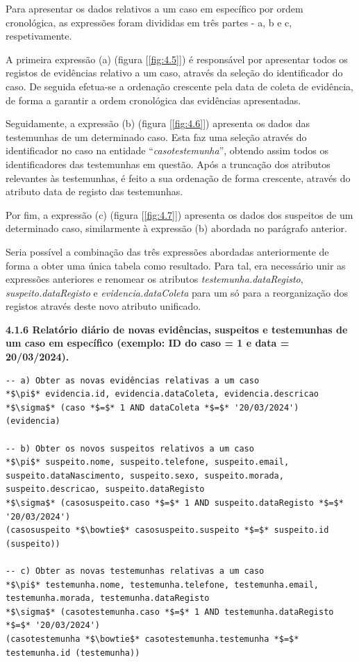 \documentclass[a4paper,12pt]{scrreprt}
\begin{document}
Para apresentar os dados relativos a um caso em específico por ordem cronológica, as expressões foram divididas em três partes - a, b e c, respetivamente.

A primeira expressão (a) (figura [\ref{fig:4.5}]) é responsável por apresentar todos os registos de evidências relativo a um caso, através da seleção do identificador do caso. De seguida efetua-se a ordenação crescente pela data de coleta de evidência, de forma a garantir a ordem cronológica das evidências apresentadas.

Seguidamente, a expressão (b) (figura [\ref{fig:4.6}]) apresenta os dados das testemunhas de um determinado caso. Esta faz uma seleção através do identificador no caso na entidade “\textit{casotestemunha}”, obtendo assim todos os identificadores das testemunhas em questão. Após a truncação dos atributos relevantes às testemunhas, é feito a sua ordenação de forma crescente, através do atributo data de registo das testemunhas.

Por fim, a expressão (c) (figura [\ref{fig:4.7}]) apresenta os dados dos suspeitos de um determinado caso, similarmente à expressão (b) abordada no parágrafo anterior.

Seria possível a combinação das três expressões abordadas anteriormente de forma a obter uma única tabela como resultado. Para tal, era necessário unir as expressões anteriores e renomear os atributos \textit{testemunha.dataRegisto}, \textit{suspeito.dataRegisto} e \textit{evidencia.dataColeta} para um só para a reorganização dos registos através deste novo atributo unificado.

\clearpage %
{\large\textbf{4.1.6 Relatório diário de novas evidências, suspeitos e testemunhas de um caso em específico (exemplo: ID do caso = 1 e data = 20/03/2024).}}

\vspace{0.2cm}
\begin{lstlisting}[escapechar=*]
-- a) Obter as novas evidências relativas a um caso
*$\pi$* evidencia.id, evidencia.dataColeta, evidencia.descricao
*$\sigma$* (caso *$=$* 1 AND dataColeta *$=$* '20/03/2024') (evidencia)

-- b) Obter os novos suspeitos relativos a um caso
*$\pi$* suspeito.nome, suspeito.telefone, suspeito.email, suspeito.dataNascimento, suspeito.sexo, suspeito.morada, suspeito.descricao, suspeito.dataRegisto
*$\sigma$* (casosuspeito.caso *$=$* 1 AND suspeito.dataRegisto *$=$* '20/03/2024')
(casosuspeito *$\bowtie$* casosuspeito.suspeito *$=$* suspeito.id (suspeito))

-- c) Obter as novas testemunhas relativas a um caso
*$\pi$* testemunha.nome, testemunha.telefone, testemunha.email, testemunha.morada, testemunha.dataRegisto
*$\sigma$* (casotestemunha.caso *$=$* 1 AND testemunha.dataRegisto *$=$* '20/03/2024')
(casotestemunha *$\bowtie$* casotestemunha.testemunha *$=$* testemunha.id (testemunha))
\end{lstlisting}
\end{document}
